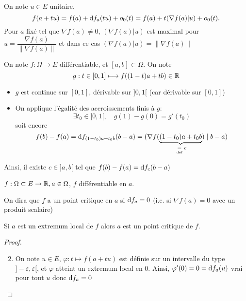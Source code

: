 \begin{rem}
    On note $u\in E$ unitaire. \[ f(a+tu)=f(a)+\mathrm{d} f_a(tu)+o_0(t)=f(a)+t (\nabla f(a)|u) +o_0(t).\] Pour $a$ fixé tel que $\nabla f(a)\neq 0$, $(\nabla f(a)|u)$ est maximal pour $u=\dfrac{\nabla f(a)}{\|\nabla f(a)\|}$ et dans ce cas $(\nabla f(a)|u)=\|\nabla f(a)\|$
\end{rem}

\begin{rem}
    On note $f:\Omega\to E$ différentiable, et $[a, b]\subset \Omega$. On note \[ g:t\in[0, 1]\longmapsto f((1-t)a+tb)\in\mathbb R \]
    \begin{itemize}
        \item $g$ est continue sur $[0, 1]$, dérivable sur $]0, 1[$ (car dérivable sur $[0, 1]$)
        \item On applique l'égalité des accroissements finis à $g$: \[
                \exists t_0\in ]0, 1[, \quad g(1)-g(0)=g'(t_0)
            \]
            soit encore \[
                f(b)-f(a)=\mathrm{d} f_{(1-t_0)a+t_0b}(b-a)=(\nabla f(\underbrace{(1-t_0)a+t_0b}_{\;\underset{\text{def}}=\; c})\;|\;b-a)
            \]
    \end{itemize}
    Ainsi, il existe $c\in ]a, b[$ tel que $f(b)-f(a)=\mathrm{d} f_c(b-a)$
\end{rem}

\begin{thmdef}
    \Hyp $f:\Omega\subset E\to \mathbb R, a\in \Omega$, $f$ différentiable en $a$.
    \begin{concenum}
    \item On dira que $f$ a un point critique en $a$ si $\mathrm{d} f_a=0$ (i.e. si $\nabla f(a)=0$ avec un produit scalaire)
    \item Si $a$ est un extremum local de $f$ alors $a$ est un point critique de $f$.
    \end{concenum}
\end{thmdef}

\begin{proof}
    \begin{enumerate}
        \setcounter{enumi}{1}
    \item On note $u\in E$, $\varphi: t\longmapsto f(a+tu)$ est définie sur un intervalle du type $]-\varepsilon, \varepsilon[$, et $\varphi$ atteint un extremum local en $0$. Ainsi, $\varphi'(0)=0=\mathrm{d} f_a(u)$ vrai pour tout $u$ donc $\mathrm{d} f_a=0$
\end{enumerate}
\end{proof}

